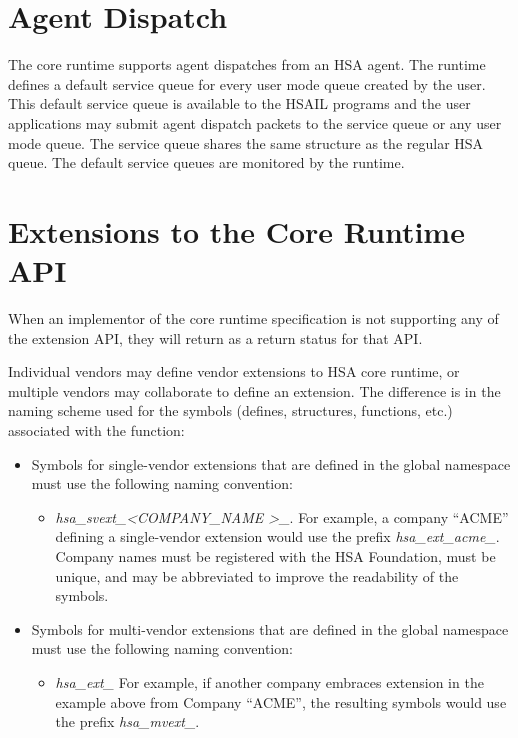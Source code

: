\documentclass[draft]{book}
\begin{document}

% 

\hypertarget{agent}{}\section{Agent Dispatch}\label{agent}
The core runtime supports agent dispatches from an HSA agent. The
runtime defines a default service queue for every user mode queue created by the
user. This default service queue is available to the HSAIL programs and the user
applications may submit agent dispatch packets to the service queue or any user
mode queue. The service queue shares the same structure as the regular HSA
queue. The default service queues are monitored by the
runtime.


\hypertarget{extensions}{}\section{Extensions to the Core Runtime
  API}\label{extensions}

When an implementor of the core runtime specification is not supporting any of
the extension API, they will return
 as a return status for that API.

Individual vendors may define vendor extensions to HSA core runtime, or multiple
vendors may collaborate to define an extension. The difference is in the naming
scheme used for the symbols (defines, structures, functions, etc.) associated
with the function:

\begin{itemize}
\item Symbols for single-vendor extensions that are defined in the global
  namespace must use the following naming convention:
  \begin{itemize}
  \item \emph{hsa_svext_\textless COMPANY_NAME \textgreater_}. For example,
    a company ``ACME'' defining a single-vendor extension would use the prefix
    \emph{hsa_ext_acme_}. Company names must be registered with the HSA
    Foundation, must be unique, and may be abbreviated to improve the
    readability of the symbols.
  \end{itemize}
\item Symbols for multi-vendor extensions that are defined in the global
  namespace must use the following naming convention:
  \begin{itemize}
  \item \emph{hsa_ext_} For example, if another company embraces extension in
    the example above from Company ``ACME'', the resulting symbols would use the
    prefix \emph{hsa_mvext_}.
  \end{itemize}
\end{itemize}
\end{document}
